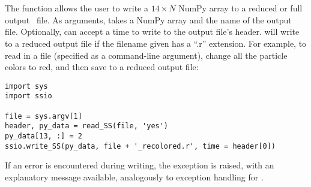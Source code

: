 \section{}
The  function allows the user to write a $14 \times
N$ NumPy array to a reduced or full output \pkd\ file.  As
arguments,  takes a NumPy array and the name of the
output file.  Optionally,  can accept a time to
write to the output file's header.   will write to a
reduced output file if the filename given has a ``.r'' extension.  For
example, to read in a file (specified as a command-line argument),
change all the particle colors to red, and then save to a reduced
output file:
\begin{verbatim}
import sys
import ssio

file = sys.argv[1]
header, py_data = read_SS(file, 'yes')
py_data[13, :] = 2
ssio.write_SS(py_data, file + '_recolored.r', time = header[0])
\end{verbatim}
If an error is encountered during writing, the 
exception is raised, with an explanatory message available,
analogously to exception handling for .


